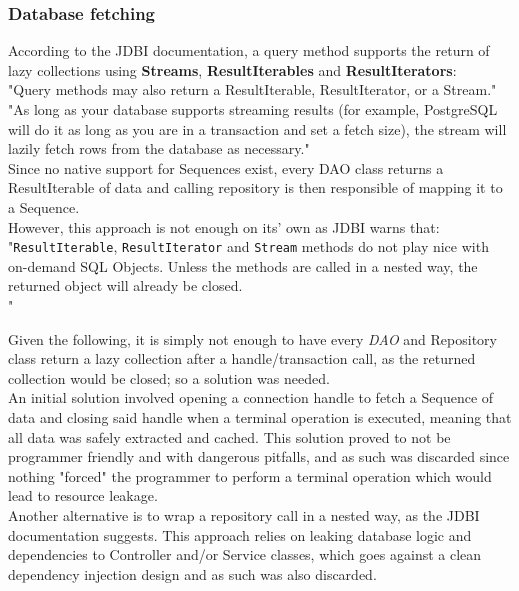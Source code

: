 \subsubsection{Database fetching}

According to the JDBI documentation\cite{jdbi}, a query method supports the return of lazy
collections using \textbf{Streams}, \textbf{ResultIterables} and \textbf{ResultIterators}:\\

"Query methods may also return a ResultIterable\cite{resultiterable}, ResultIterator\cite{resultiterator}, or a Stream\cite{streams}."\\

"As long as your database supports streaming results (for example, PostgreSQL will do it as long as you are in a transaction and set a fetch size), the
stream will lazily fetch rows from the database as necessary."\\

Since no native support for Sequences exist, every DAO class returns a ResultIterable of data and calling repository is then responsible of mapping it to
a Sequence.\\

However, this approach is not enough on its' own as JDBI warns that:\\

"\texttt{ResultIterable}, \texttt{ResultIterator} and \texttt{Stream} methods do not play nice with on-demand SQL Objects. Unless the methods are called in a nested way, the
returned object will already be closed.\\"

Given the following, it is simply not enough to have every \textit{DAO} and Repository class return a lazy collection after a handle/transaction call,
as the returned collection would be closed; so a solution was needed.\\

An initial solution involved opening a connection handle to fetch a Sequence of data and closing said handle when a terminal operation is executed, meaning that all data was
safely extracted and cached. This solution proved to not be programmer friendly and with dangerous pitfalls, and as such was discarded since nothing "forced" the programmer to
perform a terminal operation which would lead to resource leakage.\\ 

Another alternative is to wrap a repository call in a nested way, as the JDBI documentation suggests. This approach relies on leaking database logic and dependencies to Controller
and/or Service classes, which goes against a clean dependency injection design and as such was also discarded.\\

